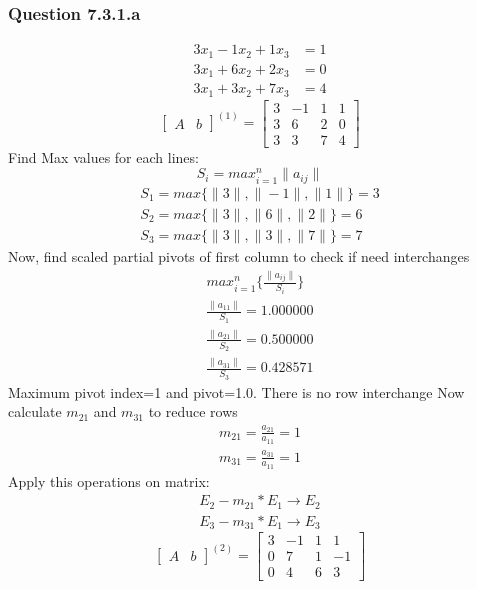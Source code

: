 \documentclass{article}
\begin{document}
\subsubsection{Question 7.3.1.a}
\begin{align}
\label{q7.3.1.a.1}3x_{1}-1x_{2}+1x_{3}&=1 \\
\label{q7.3.1.a.2}3x_{1}+6x_{2}+2x_{3}&=0 \\
\label{q7.3.1.a.3}3x_{1}+3x_{2}+7x_{3}&=4
\end{align}
\[
\left[
\begin{array}{c|c}
A&b
\end{array}
\right]^{(1)}
=
\left[
\begin{array}{ccc|c}
	3&-1&1&1\\
	3&6&2&0\\
	3&3&7&4 
\end{array}
\right]
\]
Find Max values for each lines: 
\begin{equation}
\label{findSMax2}S_{i}=max_{i=1}^n\|a_{ij}\|
\end{equation}
\begin{align}
	S_{1}=max\{\|3\|,\|-1\|,\|1\|\}=3\\
	S_{2}=max\{\|3\|,\|6\|,\|2\|\}=6\\
	S_{3}=max\{\|3\|,\|3\|,\|7\|\}=7
\end{align}
Now, find scaled partial pivots of first column to check if need interchanges
\begin{align}
	max_{i=1}^n\{\frac{\|a_{ij}\|}{S_{i}}\}\\
	\frac{\|a_{11}\|}{S_{1}}=1.000000\\
	\frac{\|a_{21}\|}{S_{2}}=0.500000\\
	\frac{\|a_{31}\|}{S_{3}}=0.428571
\end{align}
Maximum pivot index=1 and pivot=1.0. There is no row interchange
Now calculate $m_{21}$ and $m_{31}$ to reduce rows 
\begin{align}
	m_{21}=\frac{a_{21}}{a_{11}}=1\\
	m_{31}=\frac{a_{31}}{a_{11}}=1
\end{align}
Apply this operations on matrix:
\begin{align}
	E_{2}-m_{21}*E_{1}\rightarrow E_{2}\\
	E_{3}-m_{31}*E_{1}\rightarrow E_{3}
\end{align}
\[
\left[
\begin{array}{c|c}
A&b
\end{array}
\right]^{(2)}
=
\left[
\begin{array}{ccc|c}
	3&-1&1&1\\
	0&7&1&-1\\
	0&4&6&3 
\end{array}
\right]
\]
\end{document}
